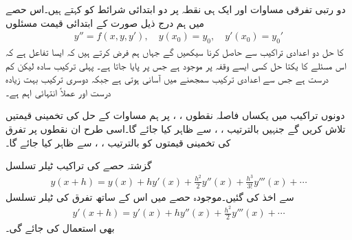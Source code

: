 دو رتبی تفرقی مساوات اور  ایک ہی نقطہ پر دو ابتدائی شرائط کو   کہتے ہیں۔اس حصے میں ہم درج ذیل صورت کے ابتدائی قیمت مسئلوں 
\begin{align}\label{مساوات_اعدادی_دو_درجی-ابتدائی_قیمت_الف}
y''=f(x,y,y'),\quad y(x_0)=y_0,\quad y'(x_0)=y_0'
\end{align} 
کا حل دو اعدادی تراکیب سے حاصل کرنا سیکھیں گے جہاں ہم فرض کرتے ہیں کہ  ایسا تفاعل ہے کہ اس مسئلے کا یکتا حل کسی ایسے وقفہ پر  موجود ہے جس پر  پایا جاتا ہے۔ پہلی ترکیب سادہ لیکن کم درست ہے جس سے اعدادی ترکیب سمجھنے میں آسانی ہوتی ہے  جبکہ دوسری ترکیب بہت زیادہ درست اور عملاً انتہائی اہم ہے۔

دونوں تراکیب میں یکساں فاصلہ  نقطوں ، ،  پر  ہم مساوات  کے حل  کی تخمینی قیمتیں تلاش کریں گے جنہیں بالترتیب ، ،  سے ظاہر کیا جائے گا۔اسی طرح ان نقطوں پر تفرق  کی تخمینی قیمتوں کو بالترتیب ، ،  سے ظاہر کیا جائے گا۔

گزشتہ حصے کی تراکیب ٹیلر تسلسل
\begin{align}\label{مساوات_اعدادی_دو_درجی-ابتدائی_قیمت_ب}
y(x+h)=y(x)+hy'(x)+\tfrac{h^2}{2}y''(x)+\tfrac{h^3}{3!}y'''(x)+\cdots
\end{align}
سے اخذ کی گئیں۔موجودہ حصے میں اس کے ساتھ تفرق کی ٹیلر تسلسل
\begin{align}\label{مساوات_اعدادی_دو_درجی-ابتدائی_قیمت_پ}
y'(x+h)=y'(x)+hy''(x)+\tfrac{h^2}{2}y'''(x)+\cdots
\end{align}
بھی استعمال کی جائے گی۔

